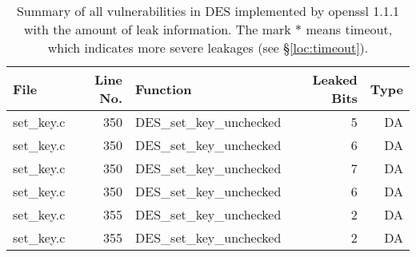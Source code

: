 \begin{table}%
\centering\tiny\scriptsize
\caption{Summary of all vulnerabilities in DES implemented by openssl 1.1.1 with the amount of leak information. The mark $*$ means timeout, which indicates more severe leakages (see \S\ref{loc:timeout}).}\label{tab:DESopenssl}
\begin{tabular}{lrlrr}
\hline
\textbf{File} & \textbf{Line No.} & \textbf{Function} & \textbf{Leaked Bits} & \textbf{Type} \\\hline
set\_key.c& 350&DES\_set\_key\_unchecked&5 &DA\\
set\_key.c& 350&DES\_set\_key\_unchecked&6 &DA\\
set\_key.c& 350&DES\_set\_key\_unchecked&7 &DA\\
set\_key.c& 350&DES\_set\_key\_unchecked&6 &DA\\
set\_key.c& 355&DES\_set\_key\_unchecked&2 &DA\\
set\_key.c& 355&DES\_set\_key\_unchecked&2 &DA\\
\hline
\end{tabular}
\end{table}
